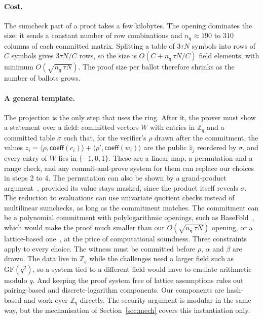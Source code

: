 \documentclass[sigconf,anonymous]{acmart}
\newcommand{\Zq}{\mathbb{Z}_q}
\newcommand{\coeff}{\mathsf{coeff}}
\newcommand{\ip}[2]{\langle #1, #2\rangle}
\newcommand{\nq}{n_{\mathsf{q}}}
\newcommand{\zh}{\hat{z}}
\begin{document}
\paragraph{Cost.}
The sumcheck part of a proof takes a few kilobytes. The opening dominates the size: it sends a
constant number of row combinations and $\nq\approx 190$ to $310$ columns of each committed matrix.
Splitting a table of $3\tau N$ symbols into rows of $C$ symbols gives $3\tau N/C$ rows, so the size
is $O(C+\nq\,\tau N/C)$ field elements, with minimum $O(\sqrt{\nq\,\tau N})$. The proof size per
ballot therefore shrinks as the number of ballots grows.

\paragraph{A general template.}
The projection is the only step that uses the ring. After it, the prover must show a statement over
a field: committed vectors $W$ with entries in $\Zq$ and a committed table $\sigma$ such that, for
the verifier's $\rho$ drawn after the commitment, the values
$z_i=\ip{\rho}{\coeff(c_i)}+\ip{\rho'}{\coeff(w_i)}$ are the public $\zh_j$ reordered by $\sigma$, and
every entry of $W$ lies in $\{-1,0,1\}$. These are a linear map, a permutation and a range check, and
any commit-and-prove system for them can replace our choices in steps 2 to 4. The permutation can
also be shown by a grand-product argument~\cite{Neff01}, provided its value stays masked, since the
product itself reveals $\sigma$. The reduction to evaluations can use univariate quotient checks
instead of multilinear sumchecks, as long as the commitment matches. The commitment can be a
polynomial commitment with polylogarithmic openings, such as BaseFold~\cite{BaseFold}, which would
make the proof much smaller than our $O(\sqrt{\nq\,\tau N})$ opening, or a lattice-based
one~\cite{LaBRADOR,NS24}, at the price of computational soundness. Three constraints apply to every
choice. The witness must be committed before $\rho$, $\alpha$ and $\beta$ are drawn. The data live in
$\Zq$ while the challenges need a larger field such as $\mathrm{GF}(q^2)$, so a system tied to a
different field would have to emulate arithmetic modulo $q$. And keeping the proof system free of
lattice assumptions rules out pairing-based and discrete-logarithm components. Our components are
hash-based and work over $\Zq$ directly. The security argument is modular in the same way, but the
mechanisation of Section~\ref{sec:mech} covers this instantiation only.
\end{document}
